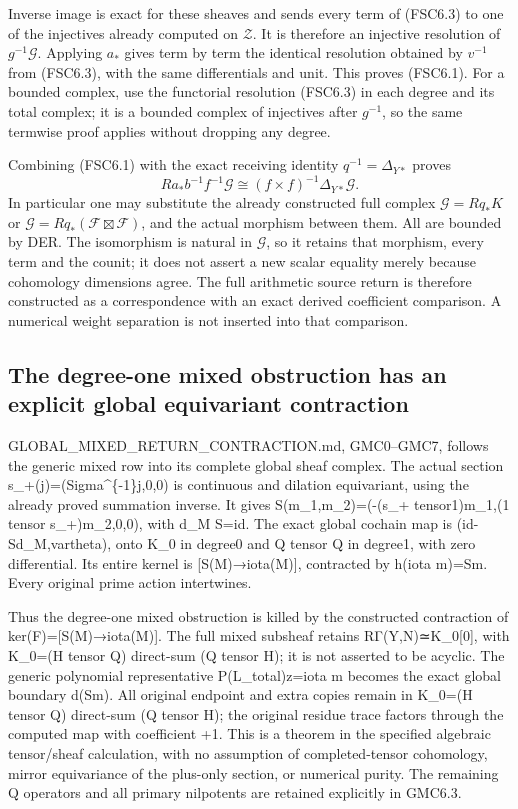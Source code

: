 Inverse image is exact for these sheaves and sends every term of
(FSC6.3) to one of the injectives already computed on \(\mathcal Z\). It
is therefore an injective resolution of \(g^{-1}\mathcal G\). Applying
\(a_*\) gives term by term the identical resolution obtained by
\(v^{-1}\) from (FSC6.3), with the same differentials and unit. This
proves (FSC6.1). For a bounded complex, use the functorial resolution
(FSC6.3) in each degree and its total complex; it is a bounded complex
of injectives after \(g^{-1}\), so the same termwise proof applies
without dropping any degree.

Combining (FSC6.1) with the exact receiving identity
\(q^{-1}=\Delta_{Y*}\) proves \[
\boxed{Ra_*b^{-1}f^{-1}\mathcal G\cong
(f\times f)^{-1}\Delta_{Y*}\mathcal G.}
\tag{FSC6.4}
\] In particular one may substitute the already constructed full complex
\(\mathcal G=Rq_*K\) or
\(\mathcal G=Rq_*(\mathcal F\boxtimes\mathcal F)\), and the actual
morphism between them. All are bounded by DER. The isomorphism is
natural in \(\mathcal G\), so it retains that morphism, every term and
the counit; it does not assert a new scalar equality merely because
cohomology dimensions agree. The full arithmetic source return is
therefore constructed as a correspondence with an exact derived
coefficient comparison. A numerical weight separation is not inserted
into that comparison.

\subsection{The degree-one mixed obstruction has an explicit global
equivariant
contraction}\label{the-degree-one-mixed-obstruction-has-an-explicit-global-equivariant-contraction-3}

GLOBAL\_MIXED\_RETURN\_CONTRACTION.md, GMC0--GMC7, follows the generic
mixed row into its complete global sheaf complex. The actual section
s\_+(j)=(Sigma\^{}\{-1\}j,0,0) is continuous and dilation equivariant,
using the already proved summation inverse. It gives
S(m\_1,m\_2)=(-(s\_+ tensor1)m\_1,(1 tensor s\_+)m\_2,0,0), with d\_M
S=id. The exact global cochain map is (id-Sd\_M,vartheta), onto K\_0 in
degree0 and Q tensor Q in degree1, with zero differential. Its entire
kernel is {[}S(M)→iota(M){]}, contracted by h(iota m)=Sm. Every original
prime action intertwines.

Thus the degree-one mixed obstruction is killed by the constructed
contraction of ker(F)={[}S(M)→iota(M){]}. The full mixed subsheaf
retains RΓ(Y,N)≃K\_0{[}0{]}, with K\_0=(H tensor Q) direct-sum (Q tensor
H); it is not asserted to be acyclic. The generic polynomial
representative P(L\_total)z=iota m becomes the exact global boundary
d(Sm). All original endpoint and extra copies remain in K\_0=(H tensor
Q) direct-sum (Q tensor H); the original residue trace factors through
the computed map with coefficient +1. This is a theorem in the specified
algebraic tensor/sheaf calculation, with no assumption of
completed-tensor cohomology, mirror equivariance of the plus-only
section, or numerical purity. The remaining Q operators and all primary
nilpotents are retained explicitly in GMC6.3.

